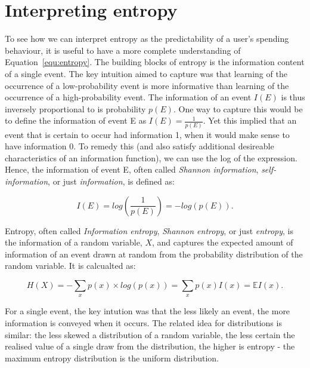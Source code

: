 
\section{Interpreting entropy}%
\label{sec:interpreting_entropy}

To see how we can interpret entropy as the predictability of a user's spending
behaviour, it is useful to have a more complete understanding of
Equation~\ref{equ:entropy}. The building blocks of entropy is the information
content of a single event.  The key intuition \citet{shannon1948mathematical}
aimed to capture was that learning of the occurrence of a low-probability event
is more informative than learning of the occurrence of a high-probability
event. The information of an event $I(E)$ is thus inversely proportional to is
probability $p(E)$. One way to capture this would be to define the information
of event E as $I(E) = \frac{1}{p(E)}$. Yet this implied that an event that is
certain to occur had information 1, when it would make sense to have
information 0. To remedy this (and also satisfy additional desireable
characteristics of an information function), we can use the log of the
expression. Hence, the information of event E, often called \textit{Shannon
information}, \textit{self-information}, or just \textit{information}, is
defined as:

\begin{equation}
    I(E) = log\left(\frac{1}{p(E)}\right) = -log(p(E)).
\end{equation}

Entropy, often called \textit{Information entropy}, \textit{Shannon entropy},
or just \textit{entropy}, is the information of a random variable, $X$, and
captures the expected amount of information of an event drawn at random from
the probability distribution of the random variable. It is calcualted as:

\begin{equation}
    H(X) = -\sum_x p(x) \times log(p(x)) = \sum_x p(x)I(x) = \mathbb{E} I(x).
\end{equation}

For a single event, the key intution was that the less likely an event, the
more information is conveyed when it occurs. The related idea for distributions
is similar: the less skewed a distribution of a random variable, the less
certain the realised value of a single draw from the distribution, the higher
is entropy - the maximum entropy distribution is the uniform distribution.


